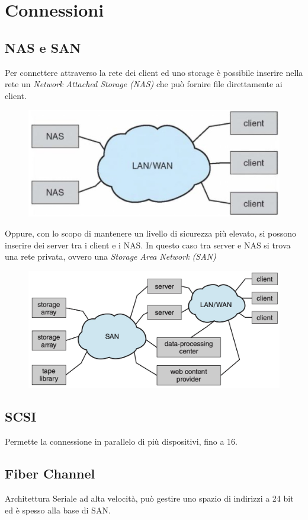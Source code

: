 \section{Connessioni}
\subsection{NAS e SAN}
Per connettere attraverso la rete dei client ed uno storage è possibile inserire nella rete un \textit{Network Attached Storage (NAS)} che può fornire file direttamente ai client.

\begin{figure}[H]
    \centering
    \includegraphics[width=0.5\linewidth]{assets/NAS-client.jpg}
\end{figure}

Oppure, con lo scopo di mantenere un livello di sicurezza più elevato, si possono inserire dei server tra i client e i NAS. In questo caso tra server e NAS si trova una rete privata, ovvero una \textit{Storage Area Network (SAN)}

\begin{figure}[H]
    \centering
    \includegraphics[width=0.5\linewidth]{assets/san.jpg}
\end{figure}

\subsection{SCSI}
Permette la connessione in parallelo di più dispositivi, fino a 16.

\subsection{Fiber Channel}
Architettura Seriale ad alta velocità, può gestire uno spazio di indirizzi a 24 bit ed è spesso alla base di SAN.
